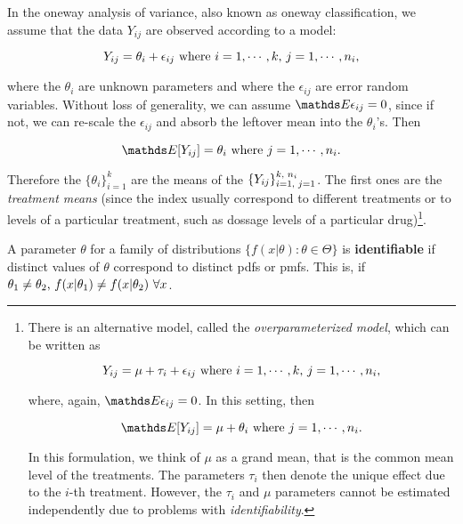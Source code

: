 \documentclass{homework}
\begin{document}
In the oneway analysis of variance, also known as oneway classification, we assume that the data $Y_{ij}$ are observed according to a model:

$$
Y_{ij} = \theta_i + \epsilon_{ij} \textnormal{ where } i = 1, \cdots, k \textnormal{, } j = 1, \cdots, n_i,
$$

where the $\theta_i$ are unknown parameters and where the $\epsilon_{ij}$ are error random variables. Without loss of generality, we can assume $\E \epsilon_{ij} = 0$, since if not, we can re-scale the $\epsilon_{ij}$ and absorb the leftover mean into the $\theta_i$'s. Then 

$$
\E[Y_{ij}] = \theta_i \textnormal{ where } j = 1, \cdots, n_i.
$$

Therefore the $\{\theta_i\}_{i=1}^{k}$ are the means of the $\{Y_{ij}\}_{i=1\textnormal{, } j=1}^{k\textnormal{, } n_i}$. The first ones are the \textit{treatment means} (since the index usually correspond to different treatments or to levels of a particular treatment, such as dossage levels of a particular drug)\footnote{There is an alternative model, called the \textit{overparameterized model}, which can be written as 

\begin{equation}
Y_{ij} = \mu + \tau_i + \epsilon_{ij} \textnormal{ where } i = 1, \cdots, k \textnormal{, } j = 1, \cdots, n_i,
\label{std linear mod}
\end{equation}

where, again, $\E \epsilon_{ij} = 0$. In this setting, then 

$$
\E[Y_{ij}] = \mu+\theta_i \textnormal{ where } j = 1, \cdots, n_i.
$$

In this formulation, we think of $\mu$ as a grand mean, that is the common mean level of the treatments. The parameters $\tau_i$ then denote the unique effect due to the $i$-th treatment. However, the $\tau_i$ and $\mu$ parameters cannot be estimated independently due to problems with \textit{identifiability}. 
}. \\

\begin{df}

A parameter $\theta$ for a family of distributions $\{f(x|\theta): \theta \in \Theta\}$ is \textbf{identifiable} if distinct values of $\theta$ correspond to distinct pdfs or pmfs. This is, if $\theta_1 \neq \theta_2\textnormal{, } f(x|\theta_1)  \neq f(x|\theta_2) \textnormal{ } \forall x$. \\

\end{df}
\end{document}
